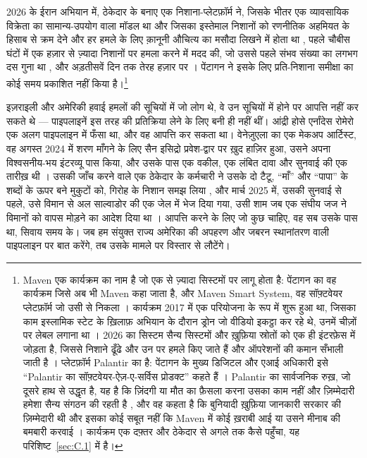 2026 के ईरान अभियान में, ठेकेदार के बनाए एक निशाना-प्लेटफ़ॉर्म ने, जिसके भीतर एक व्यावसायिक विक्रेता का सामान्य-उपयोग वाला मॉडल था और जिसका इस्तेमाल निशानों को रणनीतिक अहमियत के हिसाब से क्रम देने और हर हमले के लिए क़ानूनी औचित्य का मसौदा लिखने में होता था \autocite{livingstone2026maven}, पहले चौबीस घंटों में एक हज़ार से ज़्यादा निशानों पर हमला करने में मदद की, जो उससे पहले संभव संख्या का लगभग दस गुना था \autocite{csis2026maven}, और अड़तीसवें दिन तक तेरह हज़ार पर \autocite{breakingdefense2026maven}। पेंटागन ने इसके लिए प्रति-निशाना समीक्षा का कोई समय प्रकाशित नहीं किया है।\footnote{Maven एक कार्यक्रम का नाम है जो एक से ज़्यादा सिस्टमों पर लागू होता है: पेंटागन का वह कार्यक्रम जिसे अब भी Maven कहा जाता है, और Maven Smart System, वह सॉफ़्टवेयर प्लेटफ़ॉर्म जो उसी से निकला \autocite{csis2026maven}। कार्यक्रम 2017 में एक परियोजना के रूप में शुरू हुआ था, जिसका काम इस्लामिक स्टेट के ख़िलाफ़ अभियान के दौरान ड्रोन जो वीडियो इकट्ठा कर रहे थे, उनमें चीज़ों पर लेबल लगाना था \autocite{weisgerber2017maven,fang2019maven}। 2026 का सिस्टम सैन्य सिस्टमों और ख़ुफ़िया स्रोतों को एक ही इंटरफ़ेस में जोड़ता है, जिससे निशाने ढूँढे और उन पर हमले किए जाते हैं और ऑपरेशनों की कमान सँभाली जाती है \autocite{defensescoop2026transition}। प्लेटफ़ॉर्म Palantir का है: पेंटागन के मुख्य डिजिटल और एआई अधिकारी इसे “Palantir का सॉफ़्टवेयर-ऐज़-ए-सर्विस प्रोडक्ट” कहते हैं \autocite{defensescoop2026transition}। Palantir का सार्वजनिक रुख़, जो दूसरे हाथ से उद्धृत है, यह है कि ज़िंदगी या मौत का फ़ैसला करना उसका काम नहीं और ज़िम्मेदारी हमेशा सैन्य संगठन की रहती है \autocite{lee2026palantir}, और वह कहता है कि बुनियादी ख़ुफ़िया जानकारी सरकार की ज़िम्मेदारी थी और इसका कोई सबूत नहीं कि Maven में कोई ख़राबी आई या उसने मीनाब की बमबारी करवाई \autocite{Bloomberg2026KillChain}। कार्यक्रम एक दफ़्तर और ठेकेदार से अगले तक कैसे पहुँचा, यह परिशिष्ट~\ref{sec:C.1} में है।}

इज़राइली और अमेरिकी हवाई हमलों की सूचियों में जो लोग थे, वे उन सूचियों में होने पर आपत्ति नहीं कर सकते थे — पाइपलाइनें इस तरह की प्रतिक्रिया लेने के लिए बनी ही नहीं थीं। आंद्री होसे एर्नांदेस रोमेरो एक अलग पाइपलाइन में फँसा था, और वह आपत्ति कर सकता था। वेनेज़ुएला का एक मेकअप आर्टिस्ट, वह अगस्त 2024 में शरण माँगने के लिए सैन इसिद्रो प्रवेश-द्वार पर ख़ुद हाज़िर हुआ, उसने अपना विश्वसनीय-भय इंटरव्यू पास किया, और उसके पास एक वकील, एक लंबित दावा और सुनवाई की एक तारीख़ थी \autocite{LULAC2025HernandezRomero,Vega2025HernandezRomero}। उसकी जाँच करने वाले एक ठेकेदार के कर्मचारी ने उसके दो टैटू, “माँ” और “पापा” के शब्दों के ऊपर बने मुकुटों को, गिरोह के निशान समझ लिया \autocite{Palomera2025Blade}, और मार्च 2025 में, उसकी सुनवाई से पहले, उसे विमान से अल साल्वाडोर की एक जेल में भेज दिया गया, उसी शाम जब एक संघीय जज ने विमानों को वापस मोड़ने का आदेश दिया था \autocite{jgg2025contempt}। आपत्ति करने के लिए जो कुछ चाहिए, वह सब उसके पास था, सिवाय समय के। जब हम संयुक्त राज्य अमेरिका की अपहरण और जबरन स्थानांतरण वाली पाइपलाइन पर बात करेंगे, तब उसके मामले पर विस्तार से लौटेंगे।

